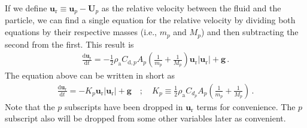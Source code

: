 If we define $\mathbf{u}_\text{r} \equiv \mathbf{u}_p - \mathbf{U}_p$ as the relative velocity between the fluid and the particle, we can find a single equation for the relative velocity by dividing both equations by their respective masses (i.e., $m_p$ and $M_p$) and then subtracting the second from the first. This result is
\begin{align}
    \frac{\text{d} \mathbf{u}_\text{r}}{\text{d} t} = -\frac{1}{2} \rho_\text{a} C_{\text{d},p} A_p \left(\frac{1}{m_p} + \frac{1}{M_p} \right) \mathbf{u}_\text{r} |\mathbf{u}_\text{r}| + \mathbf{g} \,.
\end{align}
The equation above can be written in short as
\begin{align}
    \frac{\text{d} \mathbf{u}_\text{r}}{\text{d} t} = -K_p \mathbf{u}_\text{r} |\mathbf{u}_\text{r}| + \mathbf{g} \quad ; \quad K_p \equiv \frac{1}{2} \rho_\text{a} C_{d_p} A_p \left(\frac{1}{m_p} + \frac{1}{M_p} \right) \,.
\end{align}
Note that the $p$ subscripts have been dropped in $\mathbf{u}_\text{r}$ terms for convenience. The $p$ subscript also will be dropped from some other variables later as convenient.

